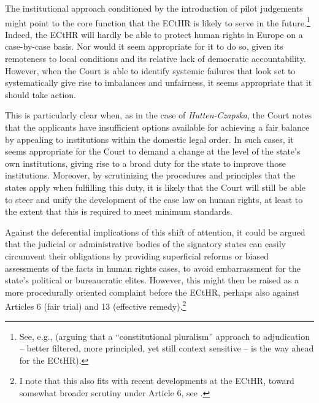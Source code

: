The institutional approach conditioned by the introduction of pilot judgements might point to the core function that the ECtHR is likely to serve in the future.\footnote{See, e.g., \cite{greer12} (arguing that a ``constitutional pluralism'' approach to adjudication -- better filtered, more principled, yet still context sensitive --  is the way ahead for the ECtHR).} Indeed, the ECtHR will hardly be able to protect human rights in Europe on a case-by-case basis. Nor would it seem appropriate for it to do so, given its remoteness to local conditions and its relative lack of democratic accountability. However, when the Court is able to identify systemic failures that look set to systematically give rise to imbalances and unfairness, it seems appropriate that it should take action.

This is particularly clear when, as in the case of {\it Hutten-Czapska}, the Court notes that the applicants have insufficient options available for achieving a fair balance by appealing to institutions within the domestic legal order. In such cases, it seems appropriate for the Court to demand a change at the level of the state's own institutions, giving rise to a broad duty for the state to improve those institutions. Moreover, by scrutinizing the procedures and principles that the states apply when fulfilling this duty, it is likely that the Court will still be able to steer and unify the development of the case law on human rights, at least to the extent that this is required to meet minimum standards.

Against the deferential implications of this shift of attention, it could be argued that the judicial or administrative bodies of the signatory states can easily circumvent their obligations by providing superficial reforms or biased assessments of the facts in human rights cases, to avoid embarrassment for the state's political or bureaucratic elites. However, this might then be raised as a more procedurally oriented complaint before the ECtHR, perhaps also against Articles 6 (fair trial) and 13 (effective remedy).\footnote{I note that this also fits with recent developments at the ECtHR, toward somewhat broader scrutiny under Article 6, see \cite{khamidov07}.}  


